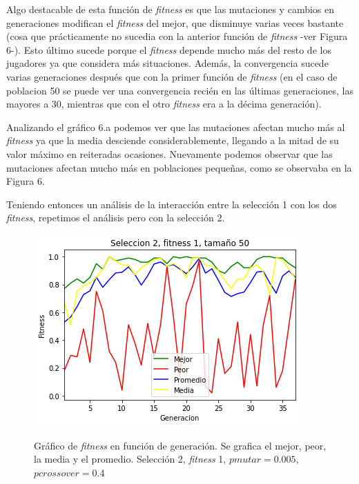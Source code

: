 \documentclass[A4paper,oneside,fleqn,11pt]{article}
\theoremstyle{definition}
\begin{document}
Algo destacable de esta función de \textit{fitness} es que las mutaciones y cambios en generaciones modifican el \textit{fitness} del mejor, que disminuye varias veces bastante (cosa que prácticamente no sucedia con la anterior función de \textit{fitness} -ver Figura 6-). Esto último sucede porque el \textit{fitness} depende mucho más del resto de los jugadores ya que considera más situaciones. Además, la convergencia sucede varias generaciones después que con la primer función de \textit{fitness} (en el caso de poblacion 50 se puede ver una convergencia recién en las últimas generaciones, las mayores a 30, mientras que con el otro \textit{fitness} era a la décima generación). 

Analizando el gráfico 6.a podemos ver que las mutaciones afectan mucho más al \textit{fitness} ya que la media desciende considerablemente, llegando a la mitad de su valor máximo en reiteradas ocasiones. Nuevamente podemos observar que las mutaciones afectan mucho más en poblaciones pequeñas, como se observaba en la Figura 6.

Teniendo entonces un análisis de la interacción entre la selección 1 con los dos \textit{fitness}, repetimos el análisis pero con la selección 2.



\begin{figure}[H]
	\captionsetup[subfigure]{position=b}
	\centering
		{\includegraphics[width=0.3\linewidth]{s2f1t50.png}}
	\caption{Gráfico de \textit{fitness} en función de generación. Se grafica el mejor, peor, la media y el promedio. Selección 2, \textit{fitness} 1, $pmutar=0.005$, $pcrossover=0.4$}
\end{figure}
\end{document}
